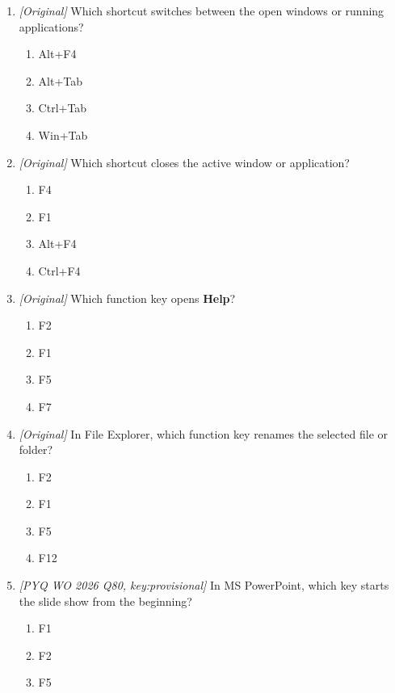 \begin{enumerate}[label=\textbf{Q\arabic*.}, leftmargin=*]
\begin{enumerate}[label=\Alph*.]
    \item Ctrl+F
    \item Ctrl+H
    \item Ctrl+R
    \item Ctrl+E
  \end{enumerate}
\item \textit{[Original]} Which shortcut switches between the open windows or
  running applications?
  \begin{enumerate}[label=\Alph*.]
    \item Alt+F4
    \item Alt+Tab
    \item Ctrl+Tab
    \item Win+Tab
  \end{enumerate}
\item \textit{[Original]} Which shortcut closes the active window or
  application?
  \begin{enumerate}[label=\Alph*.]
    \item F4
    \item F1
    \item Alt+F4
    \item Ctrl+F4
  \end{enumerate}
\item \textit{[Original]} Which function key opens \textbf{Help}?
  \begin{enumerate}[label=\Alph*.]
    \item F2
    \item F1
    \item F5
    \item F7
  \end{enumerate}
\item \textit{[Original]} In File Explorer, which function key renames the
  selected file or folder?
  \begin{enumerate}[label=\Alph*.]
    \item F2
    \item F1
    \item F5
    \item F12
  \end{enumerate}
\item \textit{[PYQ WO 2026 Q80, key:provisional]} In MS PowerPoint, which key
  starts the slide show from the beginning?
  \begin{enumerate}[label=\Alph*.]
    \item F1
    \item F2
    \item F5

\end{enumerate}
\end{enumerate}
